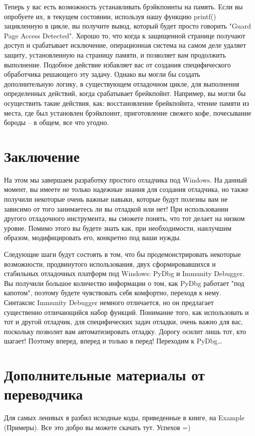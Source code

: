 \documentclass[12pt]{book}
\begin{document}
Теперь у вас есть возможность устанавливать брэйкпоинты на память. Если вы опробуете их, в текущем состоянии, используя нашу функцию printf() зацикленную в цикле, вы получите вывод, который будет просто говорить "Guard Page Access Detected". Хорошо то, что когда к защищенной странице получают доступ и срабатывает исключение, операционная система на самом деле удаляет защиту, установленную на страницу памяти, и позволяет вам продолжить выполнение. Подобное действие избавляет вас от создания специфического обработчика решающего эту задачу. Однако вы могли бы создать дополнительную логику, в существующем отладочном цикле, для выполнения определенных действий, когда срабатывает брейкпойнт. Например, вы могли бы осуществить такие действия, как: восстановление брейкпойнта, чтение памяти из места, где был установлен брэйкпоинт, приготовление свежего кофе, почесывание бороды – в общем, все что угодно.

\section{Заключение}

На этом мы завершаем разработку простого отладчика под Windows. На данный момент, вы имеете не только надежные знания для создания отладчика, но также получили некоторые очень важные навыки, которые будут полезны вам не зависимо от того занимаетесь ли вы отладкой или нет! При использовании другого отладочного инструмента, вы сможете понять, что тот делает на низком уровне. Помимо этого вы будете знать как, при необходимости, наилучшим образом, модифицировать его, конкретно под ваши нужды.

Следующие шаги будут состоять в том, что бы продемонстрировать некоторые возможности, продвинутого использования, двух сформировавшихся и стабильных отладочных платформ под Windows: PyDbg и Immunity Debugger. Вы получили большое количество информации о том, как PyDbg работает "под капотом", поэтому будете чувствовать себя комфортно, переходя к нему. Синтаксис Immunity Debugger немного отличается, но он предлагает существенно отличающийся набор функций. Понимание того, как использовать и тот и другой отладчик, для специфических задач отладки, очень важно для вас, поскольку позволит вам автоматизировать отладку. Дорогу осилит лишь тот, кто шагает! Поэтому вперед, вперед и только в перед! Переходим к PyDbg…

\section{Дополнительные материалы от переводчика}
Для самых ленивых я разбил исходные коды, приведенные в книге, на Example (Примеры). Все это добро вы можете скачать тут. Успехов =)
\end{document}
